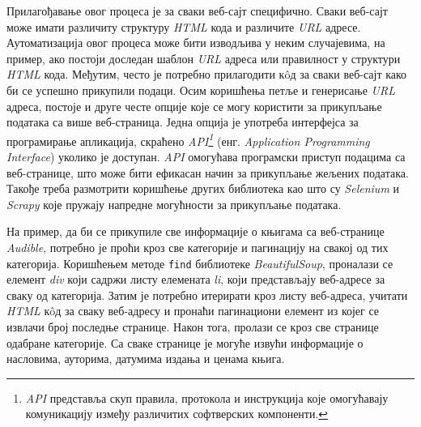\documentclass[12pt,oneside]{memoir}
\begin{document}
Прилагођавање овог процеса је за сваки веб-сајт специфично. Сваки веб-сајт може имати различиту структуру \textit{HTML} кода и различите \textit{URL} адресе. Аутоматизација овог процеса може бити изводљива у неким случајевима, на пример, ако постоји доследан шаблон \textit{URL} адреса или правилност у структури \textit{HTML} кода. Међутим, често је потребно прилагодити кôд за сваки веб-сајт како би се успешно прикупили подаци. Осим коришћења петље и генерисање \textit{URL} адреса, постоје и друге честе опције које се могу користити за прикупљање података са више веб-страница. Једна опција је употреба интерфејса за програмирање апликација, скраћено \textit{API\footnote{\textit{API} представља скуп правила, протокола и инструкција које омогућавају комуникацију између различитих софтверских компоненти.}} (енг. \textit{Application Programming Interface}) уколико је доступан. \textit{API} омогућава програмски приступ подацима са веб-странице, што може бити ефикасан начин за прикупљање жељених података. Такође треба размотрити коришћење других библиотека као што су \textit{Selenium} и \textit{Scrapy} које пружају напредне могућности за прикупљање података.

На пример, да би се прикупиле све информације о књигама са веб-странице \textit{Audible}, потребно је проћи кроз све категорије и пагинацију на свакој од тих категорија. Коришћењем методе \texttt{find} библиотеке \textit{BeautifulSoup}, проналази се елемент \textit{div} који садржи листу елемената \textit{li}, који представљају веб-адресе за сваку од категорија. Затим је потребно итерирати кроз листу веб-адреса, учитати \textit{HTML} кôд за сваку веб-адресу и пронаћи пагинациони елемент из којег се извлачи број последње странице. Након тога, пролази се кроз све странице одабране категорије. Са сваке странице је могуће извући информације о насловима, ауторима, датумима издања и ценама књига. 
\end{document}
